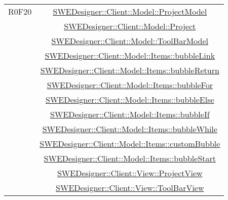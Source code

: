 \documentclass[../DefinizioneDiProdotto.tex]{subfiles}
\begin{document}
\begin{longtable}{|c|c|}
				R0F20
				& \hyperlink{SWEDesigner::Client::Model::ProjectModel}{SWEDesigner::Client::Model::ProjectModel}\\
				& \hyperlink{SWEDesigner::Client::Model::Project}{SWEDesigner::Client::Model::Project}\\
				& \hyperlink{SWEDesigner::Client::Model::ToolBarModel}{SWEDesigner::Client::Model::ToolBarModel}\\
				& \hyperlink{SWEDesigner::Client::Model::Items::bubbleLink}{SWEDesigner::Client::Model::Items::bubbleLink}\\
				& \hyperlink{SWEDesigner::Client::Model::Items::bubbleReturn}{SWEDesigner::Client::Model::Items::bubbleReturn}\\
				& \hyperlink{SWEDesigner::Client::Model::Items::bubbleFor}{SWEDesigner::Client::Model::Items::bubbleFor}\\
				& \hyperlink{SWEDesigner::Client::Model::Items::bubbleElse}{SWEDesigner::Client::Model::Items::bubbleElse}\\
				& \hyperlink{SWEDesigner::Client::Model::Items::bubbleIf}{SWEDesigner::Client::Model::Items::bubbleIf}\\
				& \hyperlink{SWEDesigner::Client::Model::Items::bubbleWhile}{SWEDesigner::Client::Model::Items::bubbleWhile}\\
				& \hyperlink{SWEDesigner::Client::Model::Items::customBubble}{SWEDesigner::Client::Model::Items::customBubble}\\
				& \hyperlink{SWEDesigner::Client::Model::Items::bubbleStart}{SWEDesigner::Client::Model::Items::bubbleStart}\\
				& \hyperlink{SWEDesigner::Client::View::ProjectView}{SWEDesigner::Client::View::ProjectView}\\
				& \hyperlink{SWEDesigner::Client::View::ToolBarView}{SWEDesigner::Client::View::ToolBarView}\\
				\hline


\end{longtable}
\end{document}

